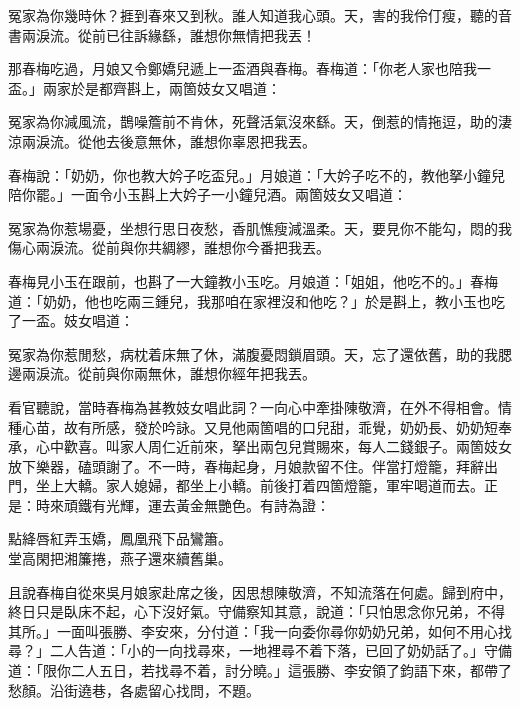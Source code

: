 \begin{myquote}
冤家為你幾時休？捱到春來又到秋。誰人知道我心頭。天，害的我伶仃瘦，聽的音書兩淚流。從前已往訴緣繇，誰想你無情把我丟！
\end{myquote}

那春梅吃過，月娘又令鄭嬌兒遞上一盃酒與春梅。春梅道：「你老人家也陪我一盃。」兩家於是都齊斟上，兩箇妓女又唱道：

\begin{myquote}
冤家為你減風流，鵲噪簷前不肯休，死聲活氣沒來繇。天，倒惹的情拖逗，助的淒涼兩淚流。從他去後意無休，誰想你辜恩把我丟。
\end{myquote}

春梅說：「奶奶，你也教大妗子吃盃兒。」月娘道：「大妗子吃不的，教他拏小鐘兒陪你罷。」一面令小玉斟上大妗子一小鐘兒酒。兩箇妓女又唱道：

\begin{myquote}
冤家為你惹場憂，坐想行思日夜愁，香肌憔瘦減溫柔。天，要見你不能勾，悶的我傷心兩淚流。從前與你共綢繆，誰想你今番把我丟。
\end{myquote}

春梅見小玉在跟前，也斟了一大鐘教小玉吃。{}月娘道：「姐姐，他吃不的。」春梅道：「奶奶，他也吃兩三鍾兒，我那咱在家裡沒和他吃？」{}於是斟上，教小玉也吃了一盃。妓女唱道：

\begin{myquote}
冤家為你惹閒愁，病枕着床無了休，滿腹憂悶鎖眉頭。天，忘了還依舊，助的我腮邊兩淚流。從前與你兩無休，誰想你經年把我丟。
\end{myquote}

看官聽說，當時春梅為甚教妓女唱此詞？一向心中牽掛陳敬濟，在外不得相會。情種心苗，故有所感，發於吟詠。又見他兩箇唱的口兒甜，乖覺，奶奶長、奶奶短奉承，心中歡喜。叫家人周仁近前來，拏出兩包兒賞賜來，每人二錢銀子。兩箇妓女放下樂器，磕頭謝了。不一時，春梅起身，月娘款留不住。伴當打燈籠，拜辭出門，坐上大轎。家人媳婦，都坐上小轎。前後打着四箇燈籠，軍牢喝道而去。正是：時來頑鐵有光輝，運去黃金無艷色。有詩為證：

\begin{myquote}
點絳唇紅弄玉嬌，鳳凰飛下品鸞簫。\\堂高閑把湘簾捲，燕子還來續舊巢。
\end{myquote}

且說春梅自從來吳月娘家赴席之後，因思想陳敬濟，不知流落在何處。{}歸到府中，終日只是臥床不起，心下沒好氣。守備察知其意，{}說道：「只怕思念你兄弟，不得其所。」一面叫張勝、李安來，分付道：「我一向委你尋你奶奶兄弟，如何不用心找尋？」二人告道：「小的一向找尋來，一地裡尋不着下落，已回了奶奶話了。」守備道：「限你二人五日，若找尋不着，討分曉。」這張勝、李安領了鈞語下來，都帶了愁顏。沿街遶巷，各處留心找問，不題。

